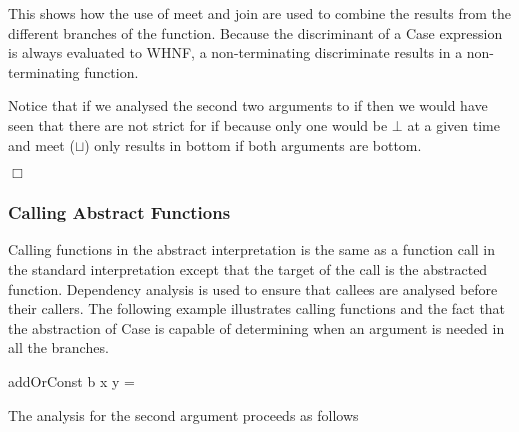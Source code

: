 This shows how the use of \<meet\> and \<join\> are used to combine the
results from the different branches of the function. Because the discriminant
of a \<Case\> expression is always evaluated to WHNF, a non-terminating
discriminate results in a non-terminating function.

Notice that if we analysed the second two arguments to \<if\> then we would
have seen that there are not strict for \<if\> because only one would be $\bot$
at a given time and \<meet\> ($\sqcup$) only results in bottom if both arguments
are bottom.


\hfill$\Box$

\subsubsection{Calling Abstract Functions}

Calling functions in the abstract interpretation is the same as a function
call in the standard interpretation except that the target of the call is
the abstracted function. Dependency analysis is used to ensure that callees
are analysed before their callers. The following example illustrates calling
functions and the fact that the abstraction of \<Case\> is capable of determining
when an argument is needed in all the branches.


\begin{haskell*}
addOrConst b x y = 
\end{haskell*}

The analysis for the second argument proceeds as follows

\begin{haskell*}
 \hasphi
{}
\end{haskell*}

